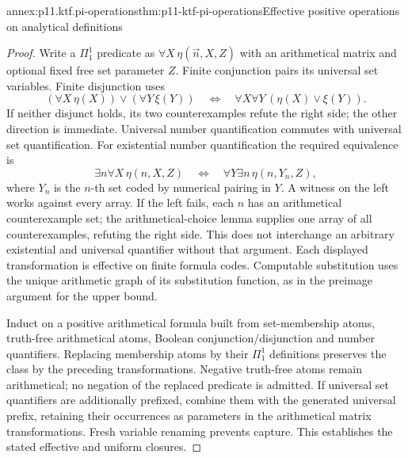 \begin{annexitem}{annex:p11.ktf.pi-operations}{thm:p11-ktf-pi-operations}{Effective positive operations on analytical definitions}
\begin{proof}
Write a \(\Pi^1_1\) predicate as \(\forall X\,\eta(\vec n,X,Z)\)
with an arithmetical matrix and optional fixed free set parameter \(Z\).
Finite conjunction pairs its universal set variables. Finite disjunction
uses
\[
 (\forall X\,\eta(X))\lor(\forall Y\,\xi(Y))
 \quad\Longleftrightarrow\quad
 \forall X\forall Y\,(\eta(X)\lor\xi(Y)).
\]
If neither disjunct holds, its two counterexamples refute the right
side; the other direction is immediate. Universal number quantification
commutes with universal set quantification. For existential number
quantification the required equivalence is
\[
 \exists n\forall X\,\eta(n,X,Z)
 \quad\Longleftrightarrow\quad
 \forall Y\exists n\,\eta(n,Y_n,Z),
\]
where \(Y_n\) is the \(n\)-th set coded by numerical pairing in
\(Y\). A witness on the left works against every array. If the
left fails, each \(n\) has an arithmetical counterexample set;
the arithmetical-choice lemma supplies one array of all counterexamples,
refuting the right side. This does not interchange an arbitrary
existential and universal quantifier without that argument.
Each displayed transformation is effective on finite formula codes.
Computable substitution uses the unique arithmetic graph of its
substitution function, as in the preimage argument for the upper bound.

Induct on a positive arithmetical formula built from set-membership
atoms, truth-free arithmetical atoms, Boolean conjunction/disjunction
and number quantifiers. Replacing membership atoms by their
\(\Pi^1_1\) definitions preserves the class by the preceding
transformations. Negative truth-free atoms remain arithmetical;
no negation of the replaced predicate is admitted. If universal set
quantifiers are additionally prefixed, combine them with the generated
universal prefix, retaining their occurrences as parameters in the
arithmetical matrix transformations. Fresh variable renaming prevents
capture. This establishes the stated effective and uniform closures.
\end{proof}
\end{annexitem}

